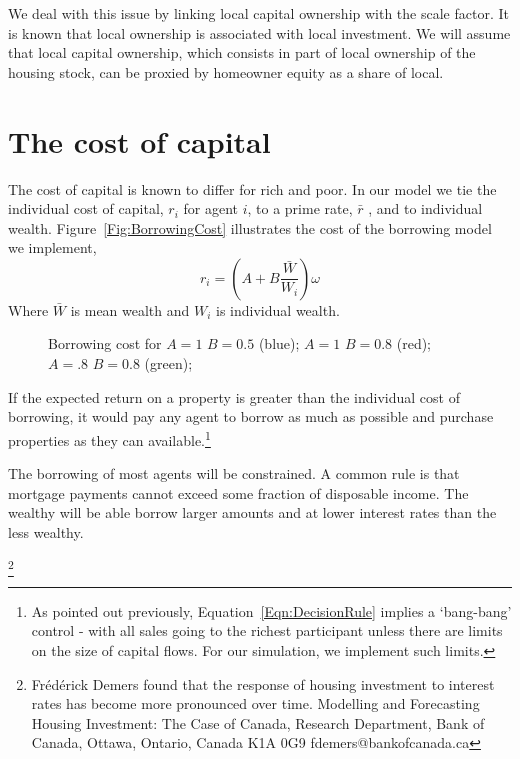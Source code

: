 We deal with this issue by linking local capital ownership with the scale factor. It is known that local ownership is associated with local investment. We will assume that local capital ownership, which consists in part of local ownership of the housing stock, can be proxied by homeowner equity as a share of local. 





\section{The cost of capital}

The cost of capital is known to differ for rich and poor. In our model we  tie the individual cost of capital,  $r_i$ for agent $i$, to a prime rate, $\bar r$ , and to individual wealth. Figure~\ref{Fig:BorrowingCost} illustrates the cost of the borrowing model we implement, 
 \[ r_i = (A + B \frac{\bar{W}}{W_i})\omega\]
Where $\bar{W}$ is mean wealth and $W_i$ is individual wealth. 
\begin{figure}[htbp]
\begin{center}
\caption{Borrowing cost for  $A=1$  $B=0.5$ (blue);  $A=1$  $B=0.8$ (red);  $A=.8$  $B=0.8$ (green);}
\label{Fig:CapitalCost}
\end{center}
\end{figure}
If the expected return on a property is greater than the individual cost of borrowing, it would pay any agent to borrow as much as possible and purchase properties as they can available.\footnote{As pointed out previously,  Equation~\ref{Eqn:DecisionRule} implies a `bang-bang' control - with all sales going to the richest participant unless there are limits on the size of capital flows. For our simulation, we implement such limits. } 
 
The borrowing of most agents will be constrained. A common rule is that mortgage payments cannot exceed some fraction of disposable income. The wealthy will be able borrow larger amounts and at lower interest rates than the less wealthy. 


\footnote{Fr\'ed\'erick Demers found that the response of housing investment to interest rates has become more pronounced over time. Modelling and Forecasting Housing Investment: The Case of Canada,  Research Department, Bank of Canada, Ottawa, Ontario, Canada K1A 0G9 fdemers@bankofcanada.ca} 




